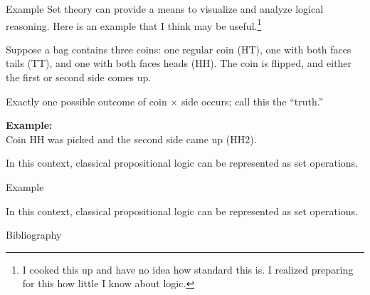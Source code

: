 \documentclass[8pt]{beamer}\usepackage[]{graphicx}\usepackage[]{color}
\begin{document}
\begin{frame}{Example}
%
Set theory can provide a means to visualize and analyze logical reasoning.
Here is an example that I think may be useful.\footnote{I cooked this up and
have no idea how standard this is.  I realized preparing for this how
little I know about logic.}


Suppose a bag contains three coins: one regular coin (HT), one with both
faces tails (TT), and one with both faces heads (HH).  The coin is flipped,
and either the first or second side comes up.

Exactly one possible outcome
of coin $\times$ side occurs; call this the ``truth.''

\begin{minipage}{0.38\textwidth}
    \begin{center}
\end{center}
\end{minipage}
\begin{minipage}{0.58\textwidth}
    \textbf{Example:}\\
    Coin HH was picked and the second side came up (HH2).

    \vspace{1em} In this context, classical propositional logic can be
    represented as set operations.
\end{minipage}
%
\end{frame}


\begin{frame}{Example}

\begin{minipage}{0.38\textwidth}
    \begin{center}
\end{center}
\end{minipage}
\begin{minipage}{0.58\textwidth}
    \vspace{1em} In this context, classical propositional logic can be
    represented as set operations.
\end{minipage}

\end{frame}



\begin{frame}{Bibliography}
\printbibliography{}
\end{frame}
\end{document}
